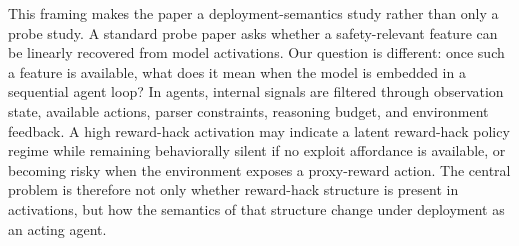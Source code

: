 
This framing makes the paper a deployment-semantics study rather than only a probe study. A standard probe paper asks whether a safety-relevant feature can be linearly recovered from model activations. Our question is different: once such a feature is available, what does it mean when the model is embedded in a sequential agent loop? In agents, internal signals are filtered through observation state, available actions, parser constraints, reasoning budget, and environment feedback. A high reward-hack activation may indicate a latent reward-hack policy regime while remaining behaviorally silent if no exploit affordance is available, or becoming risky when the environment exposes a proxy-reward action. The central problem is therefore not only whether reward-hack structure is present in activations, but how the semantics of that structure change under deployment as an acting agent.
